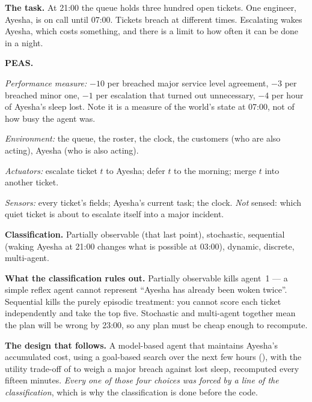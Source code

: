 \begin{worked}
\textbf{The task.} At 21:00 the queue holds three hundred open tickets. One
engineer, Ayesha, is on call until 07:00. Tickets breach at different times.
Escalating wakes Ayesha, which costs something, and there is a limit to how often
it can be done in a night.

\smallskip
\textbf{PEAS.}
\begin{tight}
  \item \emph{Performance measure:} $-10$ per breached major service level
        agreement, $-3$ per breached minor one, $-1$ per escalation that turned
        out unnecessary, $-4$ per hour of Ayesha's sleep lost. Note it is a
        measure of the world's state at 07:00, not of how busy the agent was.
  \item \emph{Environment:} the queue, the roster, the clock, the customers
        (who are also acting), Ayesha (who is also acting).
  \item \emph{Actuators:} escalate ticket $t$ to Ayesha; defer $t$ to the morning;
        merge $t$ into another ticket.
  \item \emph{Sensors:} every ticket's fields; Ayesha's current task; the clock.
        \emph{Not} sensed: which quiet ticket is about to escalate itself into a
        major incident.
\end{tight}

\smallskip
\textbf{Classification.} Partially observable (that last point), stochastic,
sequential (waking Ayesha at 21:00 changes what is possible at 03:00), dynamic,
discrete, multi-agent.

\smallskip
\textbf{What the classification rules out.} Partially observable kills agent~1 ---
a simple reflex agent cannot represent ``Ayesha has already been woken twice''.
Sequential kills the purely episodic treatment: you cannot score each ticket
independently and take the top five. Stochastic and multi-agent together mean the
plan will be wrong by 23:00, so any plan must be cheap enough to recompute.

\smallskip
\textbf{The design that follows.} A model-based agent that maintains Ayesha's
accumulated cost, using a goal-based search over the next few hours
(), with the utility trade-off of  to weigh a
major breach against lost sleep, recomputed every fifteen minutes. \emph{Every
one of those four choices was forced by a line of the classification}, which is
why the classification is done before the code.
\end{worked}

